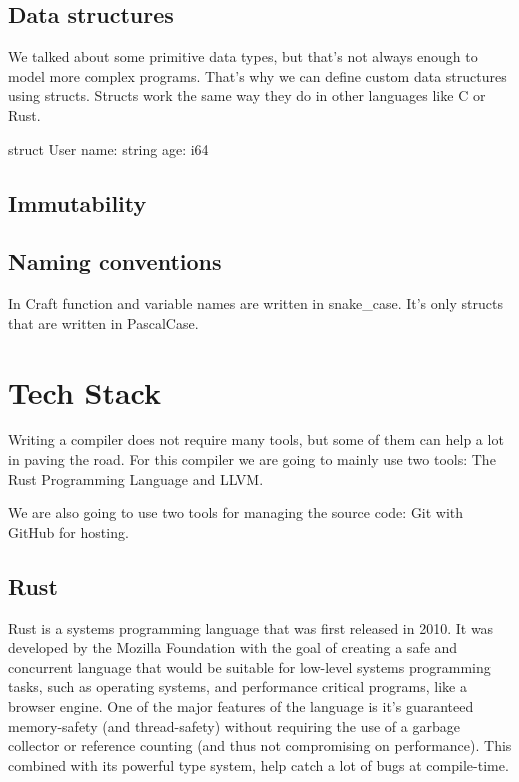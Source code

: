 ﻿\documentclass[10pt,a4paper,twocolumn,twoside]{article}
\begin{document}
\subsection{Data structures}
We talked about some primitive data types, but that's not always enough to model
more complex programs. That's why we can define custom data structures using 
structs. Structs work the same way they do in other languages like C or Rust.

\begin{code}
struct User {
    name: string
    age: i64
}
\end{code}

\subsection{Immutability}

\subsection{Naming conventions}
In Craft function and variable names are written in snake\_case. It's 
only structs that are written in PascalCase.

\section{Tech Stack}

Writing a compiler does not require many tools, but some of them can help a lot
in paving the road. For this compiler we are going to mainly use two tools: 
The Rust Programming Language and LLVM.

We are also going to use two tools for managing the source code: Git with GitHub
for hosting.

\subsection{Rust}
Rust is a systems programming language that was first released in 2010. It was
developed by the Mozilla Foundation with the goal of creating a safe and
concurrent language that would be suitable for low-level systems programming
tasks, such as operating systems, and performance critical programs, like a
browser engine. One of the major features of the language is it's guaranteed
memory-safety (and thread-safety) without requiring the use of a garbage
collector or reference counting (and thus not compromising on performance).
This combined with its powerful type system, help catch a lot of bugs at 
compile-time.
\end{document}
